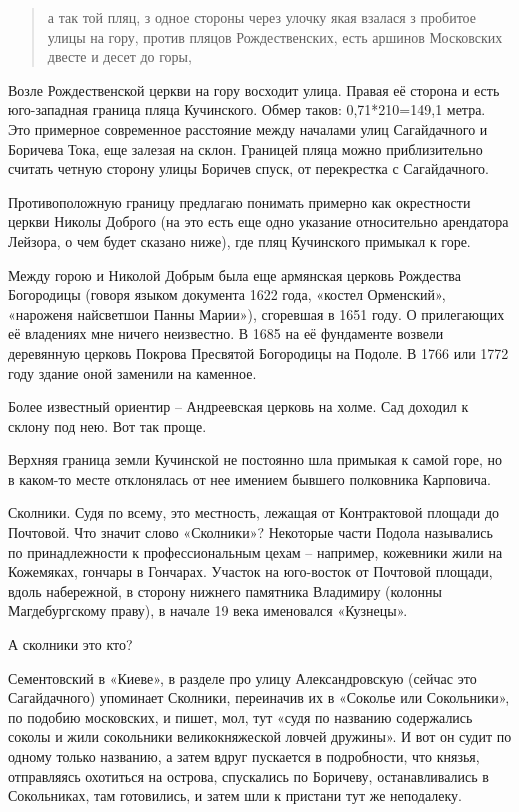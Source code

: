 \begin{quotation}
а так той пляц, з одное стороны через улочку якая взалася з пробитое улицы на гору, против пляцов Рождественских, есть аршинов Московских двесте и десет до горы, 
\end{quotation}

Возле Рождественской церкви на гору восходит улица. Правая её сторона и есть юго-западная граница пляца Кучинского. Обмер таков: 0,71*210=149,1 метра. Это примерное современное расстояние между началами улиц Сагайдачного и Боричева Тока, еще залезая на склон. Границей пляца можно приблизительно считать четную сторону улицы Боричев спуск, от перекрестка с Сагайдачного.

Противоположную границу предлагаю понимать примерно как окрестности церкви Николы Доброго (на это есть еще одно указание относительно арендатора Лейзора, о чем будет сказано ниже), где пляц Кучинского примыкал к горе. 

Между горою и Николой Добрым была еще армянская церковь Рождества Богородицы (говоря языком документа 1622 года, «костел Орменский», «нароженя найсветшои Панны Марии»), сгоревшая в 1651 году. О прилегающих её владениях мне ничего неизвестно. В 1685 на её фундаменте возвели деревянную церковь Покрова Пресвятой Богородицы на Подоле. В 1766 или 1772 году здание оной заменили на каменное.

Более известный ориентир – Андреевская церковь на холме. Сад доходил к склону под нею. Вот так проще.

Верхняя граница земли Кучинской не постоянно шла примыкая к самой горе, но в каком-то месте отклонялась от нее имением бывшего полковника Карповича.

Сколники. Судя по всему, это местность, лежащая от Контрактовой площади до Почтовой. Что значит слово «Сколники»? Некоторые части Подола назывались по принадлежности к профессиональным цехам – например, кожевники жили на Кожемяках, гончары в Гончарах. Участок на юго-восток от Почтовой площади, вдоль набережной, в сторону нижнего памятника Владимиру (колонны Магдебургскому праву), в начале 19 века именовался «Кузнецы».

А сколники это кто?

Сементовский в «Киеве»\cite{sement01}, в разделе про улицу Александровскую (сейчас это Сагайдачного) упоминает Сколники, переиначив их в «Соколье или Сокольники», по подобию московских, и пишет, мол, тут «судя по названию содержались соколы и жили сокольники великокняжеской ловчей дружины». И вот он судит по одному только названию, а затем вдруг пускается в подробности, что князья, отправляясь охотиться на острова, спускались по Боричеву, останавливались в Сокольниках, там готовились, и затем шли к пристани тут же неподалеку.

